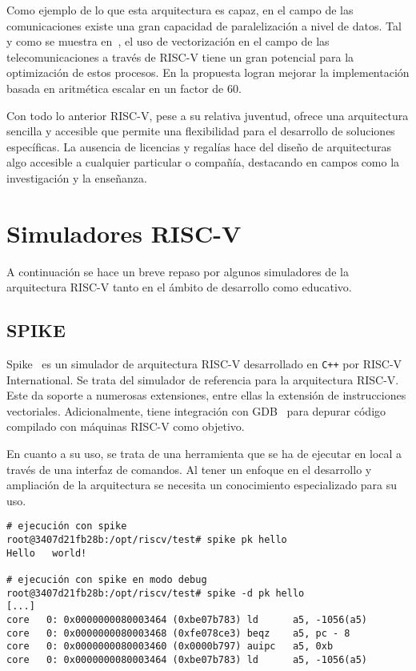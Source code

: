 Como ejemplo de lo que esta arquitectura es capaz, en el campo de las
comunicaciones existe una gran capacidad de paralelización a nivel de datos.
Tal y como se muestra en~\cite{riscv-studyCase}, el uso de vectorización en el
campo de las telecomunicaciones a través de RISC-V tiene un gran potencial para
la optimización de estos procesos. En la propuesta logran mejorar la
implementación basada en aritmética escalar en un factor de 60.

Con todo lo anterior RISC-V, pese a su relativa juventud, ofrece una
arquitectura sencilla y accesible que permite una flexibilidad para el
desarrollo de soluciones específicas. La ausencia de licencias y regalías hace
del diseño de arquitecturas algo accesible a cualquier particular o compañía,
destacando en campos como la investigación y la enseñanza.

\section{Simuladores RISC-V}

A continuación se hace un breve repaso por algunos simuladores de la
arquitectura RISC-V tanto en el ámbito de desarrollo como educativo.

\subsection{SPIKE}

Spike~\cite{spike} es un simulador de arquitectura RISC-V desarrollado en \texttt{C++}
por RISC-V International. Se trata del simulador de
referencia para la arquitectura RISC-V. Este da soporte a numerosas extensiones,
entre ellas la extensión de instrucciones vectoriales.  Adicionalmente, tiene
integración con GDB~\cite{gdb} para depurar código compilado con máquinas RISC-V
como objetivo.

En cuanto a su uso, se trata de una herramienta que se ha de ejecutar en local
a través de una interfaz de comandos. Al tener un enfoque en el desarrollo y
ampliación de la arquitectura se necesita un conocimiento especializado para su
uso.

\begin{lstlisting}[caption=Ejecución del simulador SPIKE]
# ejecución con spike
root@3407d21fb28b:/opt/riscv/test# spike pk hello
Hello   world!

# ejecución con spike en modo debug
root@3407d21fb28b:/opt/riscv/test# spike -d pk hello
[...]
core   0: 0x0000000080003464 (0xbe07b783) ld      a5, -1056(a5)
core   0: 0x0000000080003468 (0xfe078ce3) beqz    a5, pc - 8
core   0: 0x0000000080003460 (0x0000b797) auipc   a5, 0xb
core   0: 0x0000000080003464 (0xbe07b783) ld      a5, -1056(a5)
\end{lstlisting}

